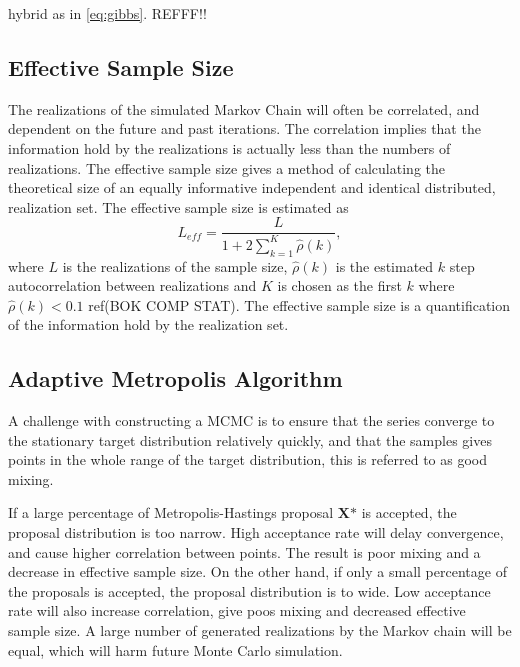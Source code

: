 \cite[p.~202]{compstat}\\ %
\cite[p.~216]{compstat}\\ %
\cite[p.~191]{MCMC}\\ %
\cite[p.~205]{MCMC}\\ %
\cite{MH}\\ %
\cite{HG} %

%
%
hybrid as in \eqref{eq:gibbs}.
REFFF!!\\

\subsection{Effective Sample Size}
The realizations of the simulated Markov Chain will often be correlated, and dependent on the future and past iterations. The correlation implies that the information hold by the realizations is actually less than the numbers of realizations. The effective sample size gives a method of calculating the theoretical size of an equally informative independent and identical distributed, realization set. The effective sample size is estimated as
\begin{equation}
L_{eff}=\frac{L}{1+2\sum_{k=1}^{K}\hat{\rho}(k)},
\end{equation}
where $L$ is the realizations of the sample size, $\hat{\rho}(k)$ is the estimated $k$ step autocorrelation between realizations and $K$ is chosen as the first $k$ where $\hat{\rho}(k)<0.1$ ref(BOK COMP STAT).
\cite[p.~174]{stuart}%
The effective sample size is a quantification of the information hold by the realization set.

\subsection{Adaptive Metropolis Algorithm}
A challenge with constructing a MCMC is to ensure that the series converge to the stationary target distribution relatively quickly, and that the samples gives points in the whole range of the target distribution, this is referred to as good mixing.

If a large percentage of Metropolis-Hastings proposal $\boldsymbol{X}\mbox{*}$ is accepted, the proposal distribution is too narrow. High acceptance rate will delay convergence, and cause higher correlation between points. The result is poor mixing and a decrease in effective sample size.
On the other hand, if only a small percentage of the proposals is accepted, the proposal distribution is to wide. Low acceptance rate will also increase correlation, give poos mixing and decreased effective sample size. A large number of generated realizations by the Markov chain will be equal, which will harm future Monte Carlo simulation.

